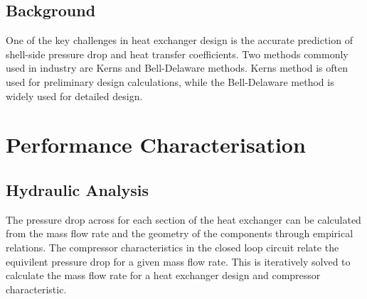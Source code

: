 \documentclass{article}
\begin{document}
\subsection{Background}
One of the key challenges in heat exchanger design is the accurate prediction of shell-side pressure drop and heat transfer coefficients.
Two methods commonly used in industry are Kerns and Bell-Delaware methods.
Kerns method is often used for preliminary design calculations, while the Bell-Delaware method is widely used for detailed design. 


\section{Performance Characterisation}

\subsection{Hydraulic Analysis}

The pressure drop across for each section of the heat exchanger can be calculated from the mass flow rate and the geometry of the components through empirical relations.
The compressor characteristics in the closed loop circuit relate the equivilent pressure drop for a given mass flow rate.
This is iteratively solved to calculate the mass flow rate for a heat exchanger design and compressor characteristic.
\end{document}
